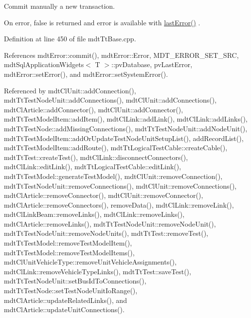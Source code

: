 Commit manually a new transaction. 

On error, false is returned and error is available with \hyperlink{classmdt_tt_base_a92adaae105cef63b18ace2e320776ca9}{last\-Error()} . 

Definition at line 450 of file mdt\-Tt\-Base.\-cpp.



References mdt\-Error\-::commit(), mdt\-Error\-::\-Error, M\-D\-T\-\_\-\-E\-R\-R\-O\-R\-\_\-\-S\-E\-T\-\_\-\-S\-R\-C, mdt\-Sql\-Application\-Widgets$<$ T $>$\-::pv\-Database, pv\-Last\-Error, mdt\-Error\-::set\-Error(), and mdt\-Error\-::set\-System\-Error().



Referenced by mdt\-Cl\-Unit\-::add\-Connection(), mdt\-Tt\-Test\-Node\-Unit\-::add\-Connections(), mdt\-Cl\-Unit\-::add\-Connections(), mdt\-Cl\-Article\-::add\-Connector(), mdt\-Cl\-Unit\-::add\-Connector(), mdt\-Tt\-Test\-Model\-Item\-::add\-Item(), mdt\-Cl\-Link\-::add\-Link(), mdt\-Cl\-Link\-::add\-Links(), mdt\-Tt\-Test\-Node\-::add\-Missing\-Connections(), mdt\-Tt\-Test\-Node\-Unit\-::add\-Node\-Unit(), mdt\-Tt\-Test\-Model\-Item\-::add\-Or\-Update\-Test\-Node\-Unit\-Setup\-List(), add\-Record\-List(), mdt\-Tt\-Test\-Model\-Item\-::add\-Route(), mdt\-Tt\-Logical\-Test\-Cable\-::create\-Cable(), mdt\-Tt\-Test\-::create\-Test(), mdt\-Cl\-Link\-::disconnect\-Connectors(), mdt\-Cl\-Link\-::edit\-Link(), mdt\-Tt\-Logical\-Test\-Cable\-::edit\-Link(), mdt\-Tt\-Test\-Model\-::generate\-Test\-Model(), mdt\-Cl\-Unit\-::remove\-Connection(), mdt\-Tt\-Test\-Node\-Unit\-::remove\-Connections(), mdt\-Cl\-Unit\-::remove\-Connections(), mdt\-Cl\-Article\-::remove\-Connector(), mdt\-Cl\-Unit\-::remove\-Connector(), mdt\-Cl\-Article\-::remove\-Connectors(), remove\-Data(), mdt\-Cl\-Link\-::remove\-Link(), mdt\-Cl\-Link\-Beam\-::remove\-Links(), mdt\-Cl\-Link\-::remove\-Links(), mdt\-Cl\-Article\-::remove\-Links(), mdt\-Tt\-Test\-Node\-Unit\-::remove\-Node\-Unit(), mdt\-Tt\-Test\-Node\-Unit\-::remove\-Node\-Units(), mdt\-Tt\-Test\-::remove\-Test(), mdt\-Tt\-Test\-Model\-::remove\-Test\-Model\-Item(), mdt\-Tt\-Test\-Model\-::remove\-Test\-Model\-Items(), mdt\-Cl\-Unit\-Vehicle\-Type\-::remove\-Unit\-Vehicle\-Assignments(), mdt\-Cl\-Link\-::remove\-Vehicle\-Type\-Links(), mdt\-Tt\-Test\-::save\-Test(), mdt\-Tt\-Test\-Node\-Unit\-::set\-Bus\-Id\-To\-Connections(), mdt\-Tt\-Test\-Node\-::set\-Test\-Node\-Unit\-Io\-Range(), mdt\-Cl\-Article\-::update\-Related\-Links(), and mdt\-Cl\-Article\-::update\-Unit\-Connections().

